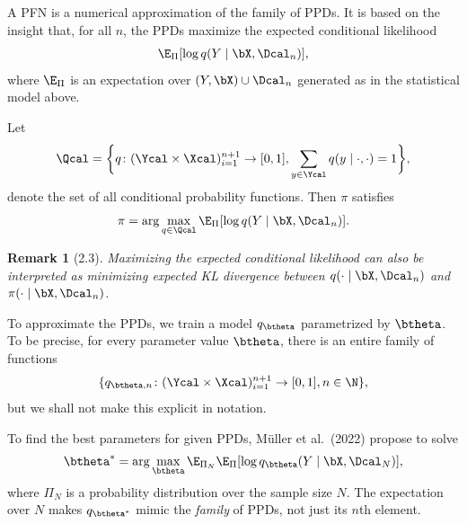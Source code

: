\documentclass[aspectratio=169,10pt]{beamer}
\newtheorem{remark}[theorem]{Remark}
\newcommand{\currentheading}{\ifx\insertsubsection\empty\insertsection\else\insertsubsection\fi}
\begin{document}
\begin{frame}{\currentheading}
A PFN is a numerical approximation of the family of PPDs. It is based on the insight that, for all $n$, the PPDs maximize the expected conditional likelihood
\begin{align*}
	\E_{\Pi} [\log q(Y \mid \bX, \Dcal_n)],
\end{align*}
where $\E_{\Pi}$ is an expectation over $(Y, \bX) \cup \Dcal_n$ generated as in the statistical model above.
\end{frame}

\begin{frame}{\currentheading}
\begin{theorem}[2.2]\label{thm:idea}
Let
\begin{align*}
	\Qcal = \biggl\{q\colon (\Ycal \times \Xcal)_{i = 1}^{n + 1} \to [0, 1], \sum_{y \in \Ycal} q(y \mid \cdot, \cdot) = 1\biggr\},
\end{align*}
denote the set of all conditional probability functions. Then $\pi$ satisfies
$$\pi = \arg\max_{q \in \Qcal}\E_\Pi [\log q(Y \mid \bX, \Dcal_n)].$$
\end{theorem}
\end{frame}

\begin{frame}{\currentheading}
\begin{remark}[2.3]
Maximizing the expected conditional likelihood can also be interpreted as minimizing expected KL divergence between $q(\cdot \mid \bX, \Dcal_n)$ and $\pi(\cdot \mid \bX, \Dcal_n)$.
\end{remark}
\end{frame}

\begin{frame}{\currentheading}
To approximate the PPDs, we train a model $q_{\btheta}$ parametrized by $\btheta$. To be precise, for every parameter value $\btheta$, there is an entire family of functions
$$\{q_{\btheta, n}\colon (\Ycal \times \Xcal)_{i = 1}^{n + 1} \to [0, 1], n \in \N\},$$
but we shall not make this explicit in notation.
\end{frame}

\begin{frame}{\currentheading}
To find the best parameters for given PPDs, Müller et al.\ (2022) propose to solve
\begin{align*}
	\btheta^* = \arg\max_{\btheta} \E_{\Pi_N}\E_{\Pi} [\log q_{\btheta}(Y \mid \bX, \Dcal_N)],
\end{align*}
where $\Pi_N$ is a probability distribution over the sample size $N$. The expectation over $N$ makes $q_{\btheta^*}$ mimic the \emph{family} of PPDs, not just its $n$th element.
\end{frame}
\end{document}
